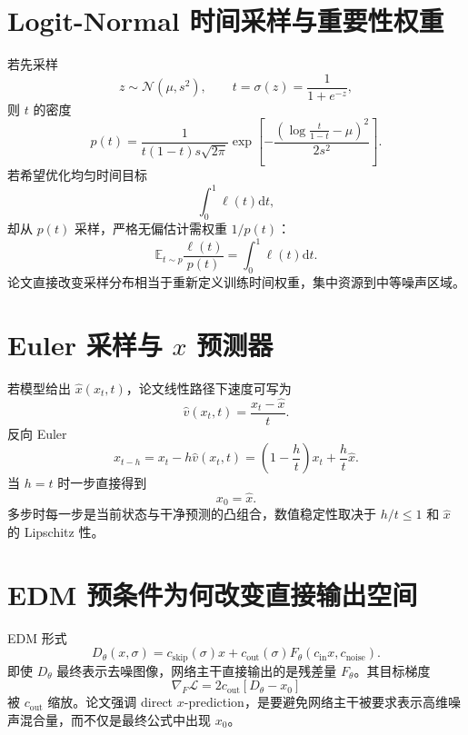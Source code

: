 \documentclass[UTF8,12pt,a4paper,fontset=none]{ctexart}
\numberwithin{equation}{section}
\newcommand{\E}{\mathbb{E}}
\newcommand{\Loss}{\mathcal{L}}
\newcommand{\dd}{\mathrm{d}}
\begin{document}
\section{Logit-Normal 时间采样与重要性权重}
若先采样
\begin{equation}
 z\sim\mathcal N(\mu,s^2),
 \qquad t=\sigma(z)=\frac1{1+e^{-z}},
\end{equation}
则 $t$ 的密度
\begin{equation}
 p(t)=\frac1{t(1-t)s\sqrt{2\pi}}
 \exp\left[-\frac{(\log\frac{t}{1-t}-\mu)^2}{2s^2}\right].
\end{equation}
若希望优化均匀时间目标
\begin{equation}
 \int_0^1\ell(t)\dd t,
\end{equation}
却从 $p(t)$ 采样，严格无偏估计需权重 $1/p(t)$：
\begin{equation}
 \E_{t\sim p}\frac{\ell(t)}{p(t)}=\int_0^1\ell(t)\dd t.
\end{equation}
论文直接改变采样分布相当于重新定义训练时间权重，集中资源到中等噪声区域。

\section{Euler 采样与 $x$ 预测器}
若模型给出 $\widehat x(x_t,t)$，论文线性路径下速度可写为
\begin{equation}
 \widehat v(x_t,t)=\frac{x_t-\widehat x}{t}.
\end{equation}
反向 Euler
\begin{equation}
 x_{t-h}=x_t-h\widehat v(x_t,t)
 =\left(1-\frac ht\right)x_t+\frac ht\widehat x.
\end{equation}
当 $h=t$ 时一步直接得到
\begin{equation}
 x_0=\widehat x.
\end{equation}
多步时每一步是当前状态与干净预测的凸组合，数值稳定性取决于 $h/t\le1$ 和 $\widehat x$ 的 Lipschitz 性。

\section{EDM 预条件为何改变直接输出空间}
EDM 形式
\begin{equation}
 D_\theta(x,\sigma)
 =c_{\mathrm{skip}}(\sigma)x
 +c_{\mathrm{out}}(\sigma)F_\theta(c_{\mathrm{in}}x,c_{\mathrm{noise}}).
\end{equation}
即使 $D_\theta$ 最终表示去噪图像，网络主干直接输出的是残差量 $F_\theta$。其目标梯度
\begin{equation}
 \nabla_{F}\Loss
 =2c_{\mathrm{out}}[D_\theta-x_0]
\end{equation}
被 $c_{\mathrm{out}}$ 缩放。论文强调 direct $x$-prediction，是要避免网络主干被要求表示高维噪声混合量，而不仅是最终公式中出现 $x_0$。
\clearpage
\end{document}
